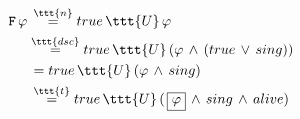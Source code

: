 \documentclass[11pt]{article}
\begin{document}
$\begin{aligned}
     \tt{F}\,\varphi &\,\overset{\ttt{n}}{=} true\,\ttt{U}\,\varphi \\
     &\overset{\ttt{dsc}}{=} true\,\ttt{U}\,(\varphi\,\land\,(true\,\lor\, sing)) \\
     &\,= true\,\ttt{U}\,(\varphi\,\land\,sing) \\
     &\,\overset{\ttt{t}}{=} true\,\ttt{U}\,(\,\boxed\varphi\,\land\,sing\,\land\,alive)
\end{aligned}$
\end{document}
